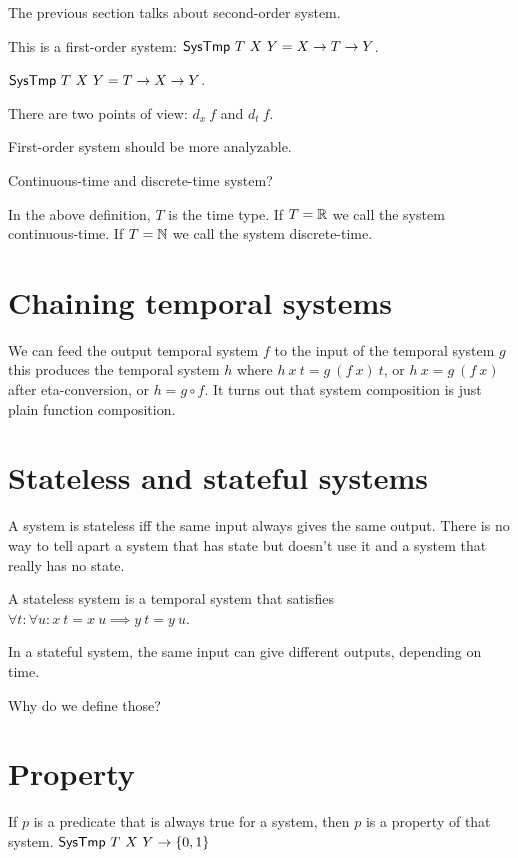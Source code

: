 The previous section talks about second-order system.

This is a first-order system:
\(\textsf{SysTmp}~T~X~Y = X \to T \to Y \).

\(\textsf{SysTmp}~T~X~Y = T \to X \to Y \).

There are two points of view: \(d_x~f\) and \(d_t~f\).

First-order system should be more analyzable.

Continuous-time and discrete-time system?

In the above definition, \(T\) is the time type.
If \(T = \mathbb{R}\) we call the system continuous-time.
If \(T = \mathbb{N}\) we call the system discrete-time.

\section{Chaining temporal systems}

We can feed the output temporal system \(f\)
to the input of the temporal system \(g\)
this produces the temporal system \(h\) where
\(h~x~t = g~(f~x)~t\),
or \(h~x = g~(f~x)\) after eta-conversion,
or \(h = g \circ f\).
It turns out that system composition is just plain function composition.

\section{Stateless and stateful systems}

A system is stateless iff the same input always gives the same output.
There is no way to tell apart a system that has state
but doesn't use it and a system that really has no state.

\begin{m:def}
    A stateless system is a temporal system that satisfies \(\forall t : \forall u: x~t = x~u \implies y~t = y~u\).
\end{m:def}

In a stateful system, the same input can give different outputs, depending on time.

Why do we define those?

\section{Property}

If \(p\) is a predicate that is always true for a system,
then \(p\) is a property of that system.
\( \textsf{SysTmp}~T~X~Y \to \{0,1\} \)

